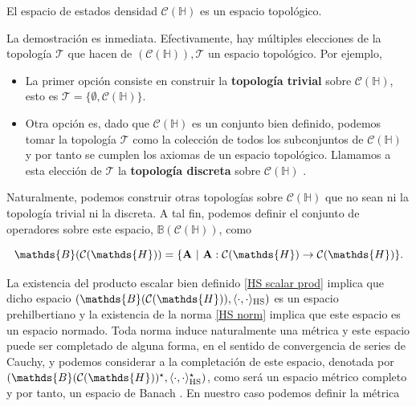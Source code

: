 \documentclass{report} %
\newcommand{\lgg}{\langle}
\newcommand{\rgg}{\rangle}
\numberwithin{equation}{section}
\begin{document}
\begin{tcolorbox}[colback=red!5!white, colframe=red!50!black, title= Topología de $\mathcal{C}(\mathds{H})$]

El espacio de estados densidad $\mathcal{C}(\mathds{H})$ es un espacio topológico.
\end{tcolorbox}
\begin{tcolorbox}

La demostración es inmediata. Efectivamente, hay múltiples elecciones de la topología $\mathcal{T}$ que hacen de $(\mathcal{C}(\mathds{H})), \mathcal{T}$ un espacio topológico. Por ejemplo,

\begin{itemize}
    \item La primer opción consiste en construir la \textbf{topología trivial} sobre $\mathcal{C}(\mathds{H})$, esto es $\mathcal{T} = \{\emptyset, \mathcal{C}(\mathds{H})\}$.
    \item Otra opción es, dado que $\mathcal{C}(\mathds{H})$ es un conjunto bien definido, podemos tomar la topología $\mathcal{T}$ como la colección de todos los subconjuntos de $\mathcal{C}(\mathds{H})$ y por tanto se cumplen los axiomas de un espacio topológico. Llamamos a esta elección de $\mathcal{T}$ la \textbf{topología discreta} sobre $\mathcal{C}(\mathds{H})$ \cite{munkres, NakaharaM}.
\end{itemize}
\end{tcolorbox}

Naturalmente, podemos construir otras topologías sobre $\mathcal{C}(\mathds{H})$ que no sean ni la topología trivial ni la discreta. A tal fin, podemos definir el conjunto de operadores sobre este espacio, $\mathds{B}(\mathcal{C}(\mathds{H}))$, como

$$
\mathds{B}(\mathcal{C}(\mathds{H})) = \{ {\bf A} \textnormal{ | } {\bf A}: \mathcal{C}(\mathds{H}) \rightarrow \mathcal{C}(\mathds{H}) \}.
$$

La existencia del producto escalar bien definido \eqref{HS scalar prod} implica que dicho espacio $(\mathds{B}(\mathcal{C}(\mathds{H})),\lgg\cdot, \cdot\rgg_{\textnormal{HS}})$ es un espacio prehilbertiano y la existencia de la norma \eqref{HS norm} implica que este espacio es un espacio normado. Toda norma induce naturalmente una métrica y este espacio puede ser completado de alguna forma, en el sentido de convergencia de series de Cauchy, y podemos considerar a la completación de este espacio, denotada por $(\mathds{B}(\mathcal{C}(\mathds{H}))^{\star},\lgg\cdot, \cdot\rgg_{\textnormal{HS}}^{\star})$, como será un espacio métrico completo y por tanto, un espacio de Banach \cite{HoracioI}. En nuestro caso podemos definir la métrica 
\end{document}
